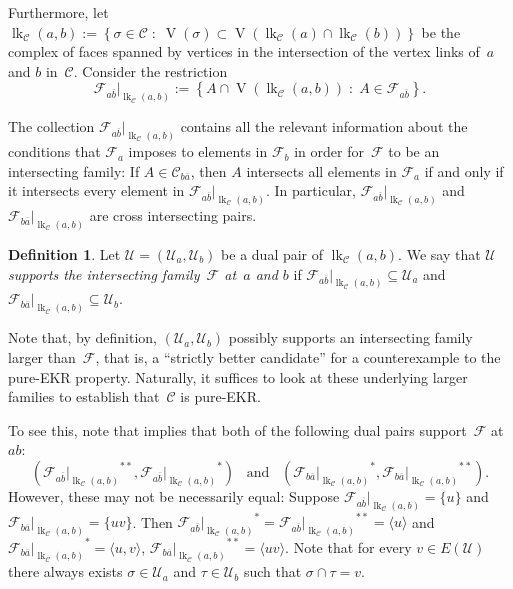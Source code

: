 \documentclass[a4paper,12pt]{amsart}
\theoremstyle{plain}
\theoremstyle{definition}
\newtheorem{definition}[theorem]{Definition}
\newcommand{\darkred}{\color{darkred}} %
\newcommand{\U}{\mathcal U}
\newcommand{\C}{\mathcal C}
\newcommand{\family}{\mathcal F}
\newcommand{\facetA}{A}
\newcommand{\face}{\sigma}
\newcommand{\smallface}{\tau}
\DeclareMathOperator{\link}{lk}
\DeclareMathOperator{\vertices}{V}
\newcommand{\defn}[1]{\emph{\darkred #1}} %
\newcommand{\set}[2]{\left\{ #1 \; : \; #2 \right\}}
\newcommand{\lkcap}[3]{\operatorname{lk}_{#1} (#2,#3)}
\begin{document}
Furthermore, let
$\lkcap{\C}{a}{b} := \set{\face \in \C}{\vertices (\face) \subset \vertices (\link_\C (a) \cap \link_\C (b))}$
be the complex of faces spanned by vertices in the intersection of the vertex links of~$a$ and $b$ in~$\C$.
Consider the restriction
\[
\family_{a\overline{b}} |_{\lkcap{\C}{a}{b}} := \set{ \facetA \cap \vertices(\lkcap{\C}{a}{b}) }{ \facetA \in \family_{a\overline b}}.
\]

The collection $\family_{a\overline{b}} |_{\lkcap{\C}{a}{b}}$ contains all the relevant information about the conditions that $\family_a$ imposes to elements in $\family_b$ in order for~$\family$ to be an intersecting family: If $\facetA\in \C_{b\overline a}$, then $\facetA$ intersects all elements in $\family_a$ if and only if it intersects every element in $\family_{a\overline{b}} |_{\lkcap{\C}{a}{b}}$.
In particular, $\family_{a\overline{b}} |_{\lkcap{\C}{a}{b}}$  and $\family_{b\overline{a}} |_{\lkcap{\C}{a}{b}}$ are cross intersecting pairs.


\begin{definition}
Let $\U=(\U_a,\U_b)$ be a dual pair of $\lkcap{\C}{a}{b}$. We say that $\U$
\defn{supports the intersecting family~$\family$ at~$a$ and $b$}
if $\family_{a\overline{b}} |_{\lkcap{\C}{a}{b}} \subseteq \U_a$ and $\family_{b\overline{a}} |_{\lkcap{\C}{a}{b}} \subseteq \U_b$.
\end{definition}

Note that, by definition, $(\U_a,\U_b)$ possibly supports an intersecting family larger than~$\family$, that is, a ``strictly better candidate'' for a counterexample to the pure-EKR property. Naturally, it suffices to look at these underlying larger families to establish that~$\C$ is pure-EKR.

To see this, note that  implies that both of the following dual pairs support~$\family$ at $ab$:
\[
\left({\family_{a\overline{b}} |_{\lkcap{\C}{a}{b}}}^{**},{\family_{a\overline{b}} |_{\lkcap{\C}{a}{b}}}^*\right) \enspace \text{ and } \enspace \left({\family_{b\overline{a}} |_{\lkcap{\C}{a}{b}}}^*,{\family_{b\overline{a}} |_{\lkcap{\C}{a}{b}}}^{**}\right).
\]
However, these may not be necessarily equal: Suppose $\family_{a\overline{b}} |_{\lkcap{\C}{a}{b}}=\{ u\}$ and  $\family_{b\overline{a}} |_{\lkcap{\C}{a}{b}}=\{uv\}$. Then
${\family_{a\overline{b}} |_{\lkcap{\C}{a}{b}}}^*={\family_{a\overline{b}} |_{\lkcap{\C}{a}{b}}}^{**}=\langle u\rangle$ and ${\family_{b\overline{a}} |_{\lkcap{\C}{a}{b}}}^*= \langle u,v\rangle$, ${\family_{b\overline{a}} |_{\lkcap{\C}{a}{b}}}^{**}= \langle uv\rangle$.
Note that for every $v\in E(\U)$ there always exists $\face \in \U_a$ and $\smallface \in \U_b$ such that $\face\cap\smallface = v$.
\end{document}
